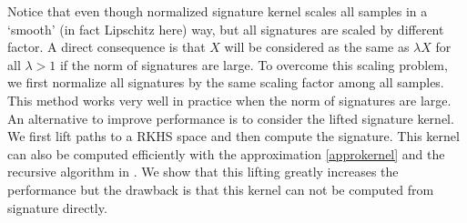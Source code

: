 \documentclass[12pt]{report}
\theoremstyle{definition}
\theoremstyle{remark}
\begin{document}
Notice that even though normalized signature kernel scales all samples in a `smooth' (in fact Lipschitz here) way, but all signatures are scaled by different factor. A direct consequence is that $X$ will be considered as the same as $\lambda X$ for all $\lambda > 1$ if the norm of signatures are large. To overcome this scaling problem, we first normalize all signatures by the same scaling factor among all samples. This method works very well in practice when the norm of signatures are large. An alternative to improve performance is to consider the lifted signature kernel. We first lift paths to a RKHS space and then compute the signature. This kernel can also be computed efficiently with the approximation \eqref{approkernel} and the recursive algorithm in \cite{chevyrev2018signature}. We show that this lifting greatly increases the performance but the drawback is that this kernel can not be computed from signature directly. 
\end{document}
